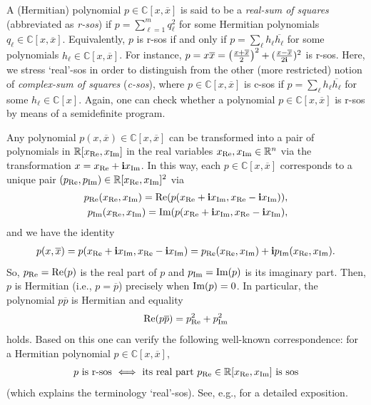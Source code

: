 \documentclass[11pt]{article}
\newcommand{\R}{\ensuremath{\mathbb{R}}}   %
\newcommand{\C}{\ensuremath{\mathbb{C}}} %
\newcommand{\ovx}{\overline x}
\newcommand{\Rea}{\text{\rm Re}}
\newcommand{\Ima}{\text{\rm Im}}
\newcommand{\bfi}{\mathbf i}
\theoremstyle{plain}
\begin{document}
A (Hermitian) polynomial $p\in \C[x,\ovx]$ is said to be a {\em real-sum of squares} (abbreviated as {\em r-sos}) if 
$p=\sum_{\ell=1}^m q_\ell^2$ for some Hermitian polynomials $q_\ell\in \C[x,\ovx]$. Equivalently, $p$ is r-sos if and only  if $p=\sum_\ell h_\ell \overline{h_\ell}$ for some polynomials $h_\ell\in\C[x,\ovx]$.
For instance, $p=x\ovx=\big({x+\ovx\over 2}\big)^2+({x-\ovx\over 2\bfi})^2$ is r-sos.
Here, we stress `real'-sos in order to distinguish from the other (more restricted) notion of {\em complex-sum of squares} ({\em c-sos}), where $p\in \C[x,\ovx]$ is c-sos if $p=\sum_\ell h_\ell \overline {h_\ell}$ for some $h_\ell\in \C[x]$.
Again, one can check whether a polynomial $p\in \C[x,\ovx]$ is r-sos by means of a semidefinite program.

Any polynomial $p(x,\ovx)\in \C[x,\ovx]$ can be transformed into a pair of polynomials in $\R[x_\Rea,x_\Ima]$ in the real variables $x_\Rea, x_\Ima\in \R^n$ via the transformation
$x=x_\Rea+ \bfi x_\Ima$. %
In this way, each $p\in\C[x,\ovx]$ corresponds to a unique pair $(p_\Rea,p_\Ima)\in \R[x_\Rea,x_\Ima]^2$  via 
\begin{align*}
p_\Rea(x_\Rea,x_\Ima)= \Rea (p(x_\Rea +\bfi x_\Ima, x_\Rea -\bfi x_\Ima)), \\
p_\Ima(x_\Rea,x_\Ima)= \Ima (p(x_\Rea +\bfi x_\Ima, x_\Rea -\bfi x_\Ima),
\end{align*}
and we have  the identity
\begin{align}\label{eq:pCR}
p(x,\ovx)= p(x_\Rea +\bfi x_\Ima, x_\Rea -\bfi x_\Ima)
= 
p_\Rea(x_\Rea,x_\Ima) + \bfi p_\Ima(x_\Rea,x_\Ima).
\end{align}
So, $p_\Rea=\Rea(p)$ is the real part of $p$ and $p_\Ima=\Ima(p)$ is its imaginary part.
Then, $p$ is Hermitian (i.e., $p=\overline p$) precisely when $\Ima(p)=0$.
In particular, the polynomial $p \overline p$ is Hermitian and equality
\begin{align}\label{eq:rsos-sos}
\Rea(p \overline p) = p_{\Rea}^2 + p_{\Ima}^2
\end{align}
 holds. Based on this one can   verify the following well-known correspondence: for a Hermitian polynomial  
$p\in\C[x,\ovx]$,
 \begin{align}\label{eq:rsos-sos}
 p \text{ is r-sos }\Longleftrightarrow \text{ its real part } p_\Rea
 \in\R[x_\Rea,x_\Ima]  \text{ is sos}
 \end{align}
(which explains the terminology `real'-sos). See, e.g., \cite[Appendix A]{GLS_2021} for a detailed exposition.
\end{document}

